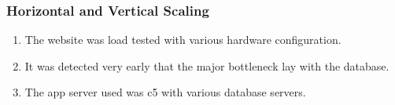 \begin{frame}
\frametitle{Horizontal and Vertical Scaling}
\begin{enumerate}
	\setlength\itemsep{1em}
	\item The website was load tested with various hardware configuration.
	\item It was detected very early that the major bottleneck lay with the database.
	\item The app server used was c5 with various database servers.
\end{enumerate}
\end{frame}



